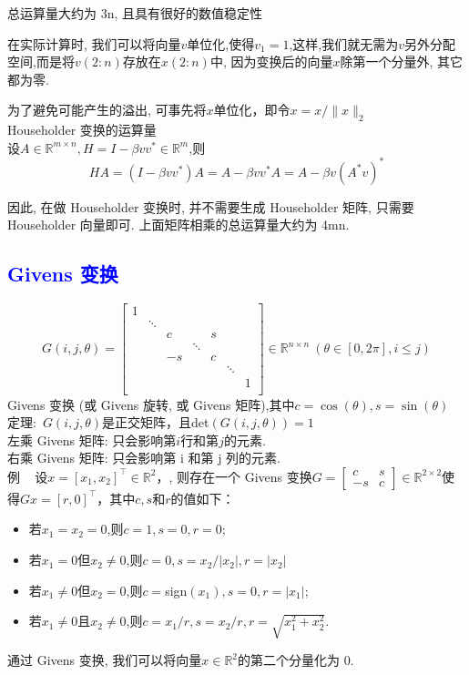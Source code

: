 \documentclass[12pt,a4paper]{article}
\begin{document}
总运算量大约为 3n, 且具有很好的数值稳定性

在实际计算时, 我们可以将向量$v$单位化,使得$v_1=1$,这样,我们就无需为$v$另外分配空间,而是将$v(2:n)$存放在$x(2:n)$中, 因为变换后的向量$x$除第一个分量外, 其它都为零.

为了避免可能产生的溢出, 可事先将$x$单位化，即令$x=x/\|x\|_2$\\

\noindent Householder 变换的运算量\\
设$A \in \mathbb{R}^{m \times n}, H=I-\beta v v^{*} \in \mathbb{R}^{m}$,则$$
H A=\left(I-\beta v v^{*}\right) A=A-\beta v v^{*} A=A-\beta v\left(A^{*} v\right)^{*}
$$

因此, 在做 Householder 变换时, 并不需要生成 Householder 矩阵, 只需要
Householder 向量即可. 上面矩阵相乘的总运算量大约为 4mn.
\subsection{\textcolor{blue}{Givens 变换}}
$$G(i,j,\theta)=
\begin{bmatrix}
1& & & & & & \\
&\ddots& & & & & \\
 & &c& &s& & \\
 & & & \ddots& & & \\
  & &-s& &c & & \\
  & & & & &\ddots& \\
  &&&&&&1\\
\end{bmatrix}\in \mathbb{R}^{n\times n} ~(\theta \in [0,2 \pi],i\leqslant j)
$$
Givens 变换 (或 Givens 旋转, 或 Givens 矩阵),其中$c=\cos(\theta),s=\sin (\theta)$\\

\noindent 定理:~$G(i,j,\theta)$是正交矩阵，且det$(G(i,j,\theta))=1$\\

\noindent 左乘 Givens 矩阵: 只会影响第$i$行和第$j$的元素.\\
右乘 Givens 矩阵: 只会影响第 i 和第 j 列的元素.\\

\noindent 例 ~ 设$x=\left[x_{1}, x_{2}\right]^{\top} \in \mathbb{R}^{2}$，, 则存在一个 Givens 变换$G=\left[\begin{array}{cc}{c} & {s} \\ {-s} & {c}\end{array}\right] \in \mathbb{R}^{2 \times 2}$使得$G x=[r, 0]^{\top}$，其中$c,s$和$r$的值如下：
\begin{itemize}
    \item {若$x_1=x_2=0$,则$c=1,s=0,r=0$;}
    \item{若$x_1=0$但$x_2\ne0$,则$c=0,s=x_2/\left|x_2\right|,r=\left|x_2\right|$}
    \item 若$x_1\ne 0$但$x_2=0$,则$c=$sign$(x_1),s=0,r=\left|x_1\right|$;
    \item 若$x_1\ne 0$且$x_2\ne 0$,则$c=x_1/r,s=x_2/r,r=\sqrt{x_1^2+x_2^2}$.
\end{itemize}
通过 Givens 变换, 我们可以将向量$x \in \mathbb{R}^2$的第二个分量化为 0.\\
\end{document}
